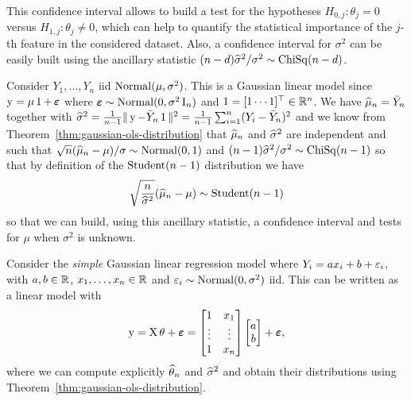 This confidence interval allows to build a test for the hypotheses $H_{0, j} : \theta_j = 0$ versus $H_{1, j} : \theta_j \neq 0$, which can help to quantify the statistical importance of the $j$-th feature in the considered dataset.
Also, a confidence interval for $\sigma^2$ can be easily built using the ancillary statistic $(n - d) \widehat \sigma^2 / \sigma^2 \sim \operatorname{ChiSq}(n - d)$.

\begin{example}
	Consider $Y_1, \ldots, Y_n$ iid $\operatorname{Normal}(\mu, \sigma^2)$. This is a Gaussian linear model since $\operatorname{{\boldsymbol y}} = \mu \operatorname{\boldsymbol 1} + \operatorname{\boldsymbol \varepsilon}$ where $\operatorname{\boldsymbol \varepsilon} \sim \operatorname{Normal}(0, \sigma^2 \operatorname{{\boldsymbol I}}_n)$ and $\operatorname{\boldsymbol 1} = [1 \cdots 1]^\top \in \mathbb R^n$.
	We have%
	$\widehat \mu_n = \bar Y_n$ together with $\widehat \sigma^2 = \frac{1}{n-1} \| \operatorname{{\boldsymbol y}} - \bar Y_n \operatorname{\boldsymbol 1} \|^2 = \frac{1}{n-1} \sum_{i=1}^n (Y_i - \bar Y_n)^2$ and we know from Theorem~\ref{thm:gaussian-ols-distribution} that $\widehat \mu_n$ and $\widehat \sigma^2$ are independent and such that $\sqrt n (\widehat \mu_n - \mu) / \sigma \sim \operatorname{Normal}(0, 1)$ and $(n-1) \widehat \sigma^2/\sigma^2 \sim \operatorname{ChiSq}(n-1)$ so that by definition of the $\operatorname{Student}(n-1)$ distribution we have
	\begin{equation*}
		\sqrt{\frac{n}{\widehat \sigma^2}} (\widehat \mu_n - \mu) \sim \operatorname{Student}(n-1)
	\end{equation*}
	so that we can build, using this ancillary statistic, a confidence interval and tests for $\mu$ when $\sigma^2$ is unknown.
\end{example}

\begin{example}
	Consider the \emph{simple} Gaussian linear regression model where $Y_i = a x_i + b + \varepsilon_i$, with $a, b \in \mathbb R$, $x_1, \ldots, x_n \in \mathbb R$ and $\varepsilon_i \sim \operatorname{Normal}(0, \sigma^2)$ iid. This can be written as a linear model with
	\begin{equation*}
		\operatorname{{\boldsymbol y}} = \operatorname{{\boldsymbol X}} \theta + \operatorname{\boldsymbol \varepsilon} =
		\begin{bmatrix}
			1 & x_1 \\
			\vdots & \vdots \\
			1 & x_n
		\end{bmatrix}
		\begin{bmatrix}
			a \\
			b
		\end{bmatrix}
		+ \operatorname{\boldsymbol \varepsilon},
	\end{equation*}
	where we can compute explicitly $\widehat \theta_n$ and $\widehat \sigma^2$ and obtain their distributions using Theorem~\ref{thm:gaussian-ols-distribution}.
\end{example}

